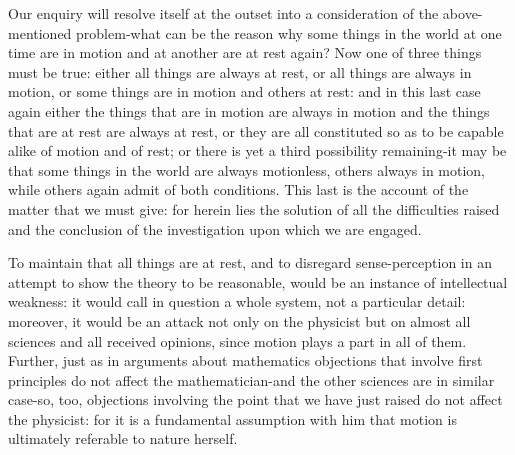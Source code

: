Our enquiry will resolve itself at the outset into a consideration
of the above-mentioned problem-what can be the reason why some things
in the world at one time are in motion and at another are at rest
again? Now one of three things must be true: either all things are
always at rest, or all things are always in motion, or some things
are in motion and others at rest: and in this last case again either
the things that are in motion are always in motion and the things
that are at rest are always at rest, or they are all constituted so
as to be capable alike of motion and of rest; or there is yet a third
possibility remaining-it may be that some things in the world are
always motionless, others always in motion, while others again admit
of both conditions. This last is the account of the matter that we
must give: for herein lies the solution of all the difficulties raised
and the conclusion of the investigation upon which we are engaged.

To maintain that all things are at rest, and to disregard sense-perception
in an attempt to show the theory to be reasonable, would be an instance
of intellectual weakness: it would call in question a whole system,
not a particular detail: moreover, it would be an attack not only
on the physicist but on almost all sciences and all received opinions,
since motion plays a part in all of them. Further, just as in arguments
about mathematics objections that involve first principles do not
affect the mathematician-and the other sciences are in similar case-so,
too, objections involving the point that we have just raised do not
affect the physicist: for it is a fundamental assumption with him
that motion is ultimately referable to nature herself. 


